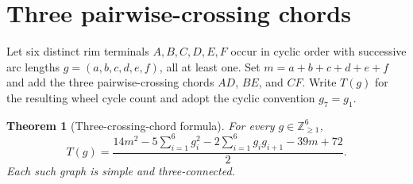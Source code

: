 \documentclass[9pt,a4paper,twocolumn]{extarticle}
\newtheorem{theorem}{Theorem}
\begin{document}
\section{Three pairwise-crossing chords}
Let six distinct rim terminals $A,B,C,D,E,F$ occur in cyclic order with successive arc lengths $g=(a,b,c,d,e,f)$, all at least one. Set $m=a+b+c+d+e+f$ and add the three pairwise-crossing chords $AD$, $BE$, and $CF$. Write $T(g)$ for the resulting wheel cycle count and adopt the cyclic convention $g_7=g_1$.

\begin{theorem}[Three-crossing-chord formula]\label{thm:triple}
For every $g\in\mathbb Z_{\ge1}^{6}$,
\begin{equation}\label{eq:triple}
\boxed{T(g)=\frac{14m^2-5\sum_{i=1}^{6}g_i^2-2\sum_{i=1}^{6}g_ig_{i+1}-39m+72}{2}.}
\end{equation}
Each such graph is simple and three-connected.
\end{theorem}
\end{document}
